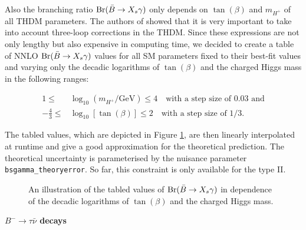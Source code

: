 \documentclass[preprint,3p,12pt]{elsarticle}
\begin{document}
Also the branching ratio ${\rm Br}(\bar{B}\to X_s\gamma)$ only depends on $\tan (\beta)$ and $m_{H^+}$ of all THDM parameters. The authors of \cite{Misiak:2015xwa} showed that it is very important to take into account three-loop corrections in the THDM. Since these expressions are not only lengthy but also expensive in computing time, we decided to create a table of NNLO ${\rm Br}(\bar{B}\to X_s\gamma)$ values for all SM parameters fixed to their best-fit values and varying only the decadic logarithms of $\tan (\beta)$ and the charged Higgs mass in the following ranges:

\begin{align}
 1\leq & \log_{10} (m_{H^+}/\text{GeV})\leq 4 \quad \text{with a step size of 0.03 and}\nonumber \\
 -\frac43 \leq & \log_{10} [\tan(\beta)]\leq 2 \quad \text{with a step size of 1/3.}\nonumber 
\end{align}

The tabled values, which are depicted in Figure \ref{fig:THDMbsgplot}, are then linearly interpolated at runtime and give a good approximation for the theoretical prediction. The theoretical uncertainty is parameterised by the nuisance parameter \texttt{bsgamma\_theoryerror}. So far, this constraint is only available for the type II.\\

\begin{figure}
  \centering
  \caption{An illustration of the tabled values of ${\rm Br}(\bar{B}\to X_s\gamma)$ in dependence of the decadic logarithms of $\tan (\beta)$ and the charged Higgs mass.}
  \label{fig:THDMbsgplot}
\end{figure}

\textbf{$B^-\to \tau \bar{\nu}$ decays}\\
\end{document}

